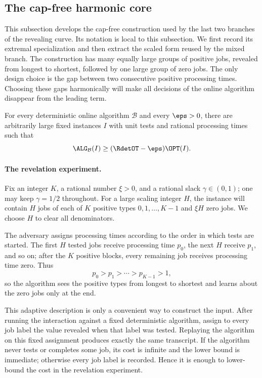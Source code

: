 \subsection{The cap-free harmonic core}
\label{sec:lower}

This subsection develops the cap-free construction used by the last two
branches of the revealing curve.  Its notation is local to this subsection.
We first record its extremal specialization and then extract the scaled form
reused by the mixed branch.  The construction
has many equally large groups of positive jobs, revealed from longest to
shortest, followed by one large group of zero jobs.  The only design choice is
the gap between two consecutive positive processing times.  Choosing these
gaps harmonically will make all decisions of the online algorithm disappear
from the leading term.

\begin{theorem}
\label{thm:lower}
For every deterministic online algorithm $\mathcal B$ and every $\eps>0$,
there are arbitrarily large fixed instances $I$ with unit tests and rational
processing times such that
\[
  \ALG_{\mathcal B}(I)\ge (\RdetOT-\eps)\OPT(I).
\]
\end{theorem}

\paragraph{The revelation experiment.}
Fix an integer $K$, a rational number $\xi>0$, and a rational slack
$\gamma\in(0,1)$; one may keep $\gamma=1/2$ throughout.  For a large scaling
integer $H$, the instance will contain $H$ jobs of each of $K$ positive types
$0,1,\ldots,K-1$ and $\xi H$ zero jobs.  We choose $H$ to clear all
denominators.

The adversary assigns processing times according to the order in which tests
are started.  The first $H$ tested jobs receive processing time $p_0$, the
next $H$ receive $p_1$, and so on; after the $K$ positive blocks, every
remaining job receives processing time zero.  Thus
\[
  p_0>p_1>\cdots>p_{K-1}>1,
\]
so the algorithm sees the positive types from longest to shortest and learns
about the zero jobs only at the end.

This adaptive description is only a convenient way to construct the input.
After running the interaction against a fixed deterministic algorithm, assign
to every job label the value revealed when that label was tested.  Replaying
the algorithm on this fixed assignment produces exactly the same transcript.
If the algorithm never tests or completes some job, its cost is infinite and
the lower bound is immediate; otherwise every job label is recorded.
Hence it is enough to lower-bound the cost in the revelation experiment.

